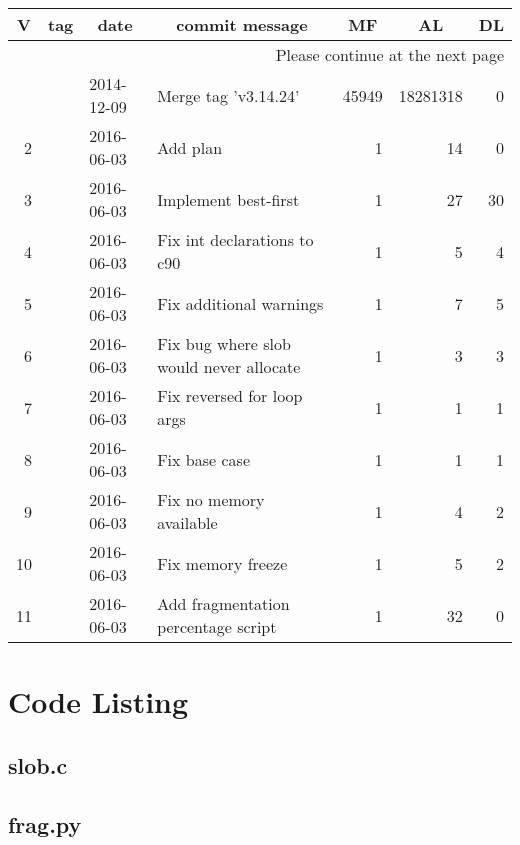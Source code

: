 \documentclass[draftclsnofoot,onecolumn]{IEEEtran}
\newcommand{\longtableendfoot}{Please continue at the next page}
\begin{document}
\begin{longtable}{|rlllrrr|}
\hline \multicolumn{1}{|c}{\textbf{V}} & \multicolumn{1}{c}{\textbf{tag}}
& \multicolumn{1}{c}{\textbf{date}}
& \multicolumn{1}{c}{\textbf{commit message}} & \multicolumn{1}{c}{\textbf{MF}}
& \multicolumn{1}{c}{\textbf{AL}} & \multicolumn{1}{c|}{\textbf{DL}} \\ \hline
\endhead

\hline \multicolumn{7}{|r|}{\longtableendfoot} \\ \hline
\endfoot

\hline%
\endlastfoot

\hline 1 &  & 2014-12-09 & Merge tag 'v3.14.24' & 45949 & 18281318 & 0 \\
\hline 2 &  & 2016-06-03 & Add plan & 1 & 14 & 0 \\
\hline 3 &  & 2016-06-03 & Implement best-first & 1 & 27 & 30 \\
\hline 4 &  & 2016-06-03 & Fix int declarations to c90 & 1 & 5 & 4 \\
\hline 5 &  & 2016-06-03 & Fix additional warnings & 1 & 7 & 5 \\
\hline 6 &  & 2016-06-03 & Fix bug where slob would never allocate & 1 & 3 & 3 \\
\hline 7 &  & 2016-06-03 & Fix reversed for loop args & 1 & 1 & 1 \\
\hline 8 &  & 2016-06-03 & Fix base case & 1 & 1 & 1 \\
\hline 9 &  & 2016-06-03 & Fix no memory available & 1 & 4 & 2 \\
\hline 10 &  & 2016-06-03 & Fix memory freeze & 1 & 5 & 2 \\
\hline 11 &  & 2016-06-03 & Add fragmentation percentage script & 1 & 32 & 0 \\
\end{longtable}


\section{Code Listing}

\subsection{slob.c}



\subsection{frag.py}


\end{document}
